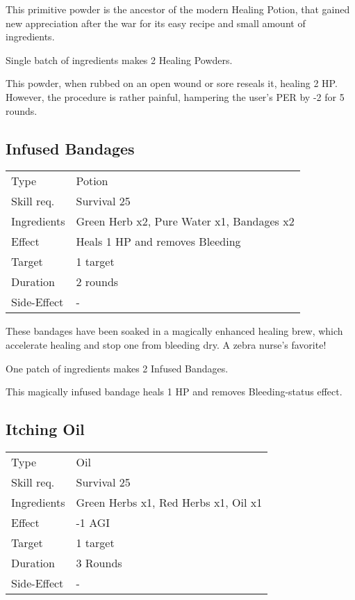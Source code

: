 \documentclass[11pt,a4paper,twocolumn]{book}
\begin{document}
\medskip

This primitive powder is the ancestor of the modern Healing Potion, that gained new appreciation after the war for its easy recipe and small amount of ingredients.

Single batch of ingredients makes 2 Healing Powders.

This powder, when rubbed on an open wound or sore reseals it, healing 2 HP. However, the procedure is rather painful, hampering the user's PER by -2 for 5 rounds.

\vfill

\subsection*{Infused Bandages}
{
	\begin{tabu} to 75mm{| X[l,4] | X[l,8] |}
		\hline
		Type 			& Potion 													\\
		Skill req.	    & Survival 25 												\\
		Ingredients     & Green Herb x2, Pure Water x1, Bandages x2					\\
		Effect     		& Heals 1 HP and removes Bleeding 							\\
		Target      	& 1 target													\\
		Duration  		& 2 rounds	 												\\
		Side-Effect     & -															\\ \hline
	\end{tabu}
	
}

\medskip

These bandages have been soaked in a magically enhanced healing brew, which accelerate healing and stop one from bleeding dry. A zebra nurse's favorite!

One patch of ingredients makes 2 Infused Bandages.

This magically infused bandage heals 1 HP and removes Bleeding-status effect.


\subsection*{Itching Oil}
{
	\begin{tabu} to 75mm{| X[l,4] | X[l,8] |}
		\hline
		Type 			& Oil 														\\
		Skill req.	    & Survival 25 												\\
		Ingredients     & Green Herbs x1, Red Herbs x1, Oil x1						\\
		Effect     		& -1 AGI 		\\
		Target      	& 1 target													\\
		Duration  		& 3 Rounds	 												\\
		Side-Effect     & -															\\ \hline
	\end{tabu}
	
}
\end{document}
